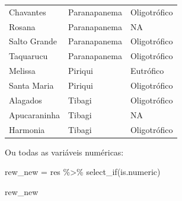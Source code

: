 \documentclass[
]{book}
\newenvironment{Shaded}{\begin{snugshade}}{\end{snugshade}}
\newcommand{\FunctionTok}[1]{\textcolor[rgb]{0.00,0.00,0.00}{#1}}
\newcommand{\NormalTok}[1]{#1}
\newcommand{\OtherTok}[1]{\textcolor[rgb]{0.56,0.35,0.01}{#1}}
\newcommand{\SpecialCharTok}[1]{\textcolor[rgb]{0.00,0.00,0.00}{#1}}
\begin{document}
\begin{table}
\begin{tabular}{lll}
Chavantes & Paranapanema & Oligotrófico\\
Rosana & Paranapanema & NA\\
Salto Grande & Paranapanema & Oligotrófico\\
\addlinespace
Taquarucu & Paranapanema & Oligotrófico\\
Melissa & Piriqui & Eutrófico\\
Santa Maria & Piriqui & Oligotrófico\\
Alagados & Tibagi & Oligotrófico\\
Apucaraninha & Tibagi & NA\\
\addlinespace
Harmonia & Tibagi & Oligotrófico\\
\bottomrule
\end{tabular}
\endgroup{}
\end{table}

Ou todas as variáveis numéricas:

\begin{Shaded}
\begin{Highlighting}[]
\NormalTok{rew\_new }\OtherTok{=}\NormalTok{ res }\SpecialCharTok{\%\textgreater{}\%} 
  \FunctionTok{select\_if}\NormalTok{(is.numeric)}

\NormalTok{rew\_new}
\end{Highlighting}
\end{Shaded}
\end{document}
